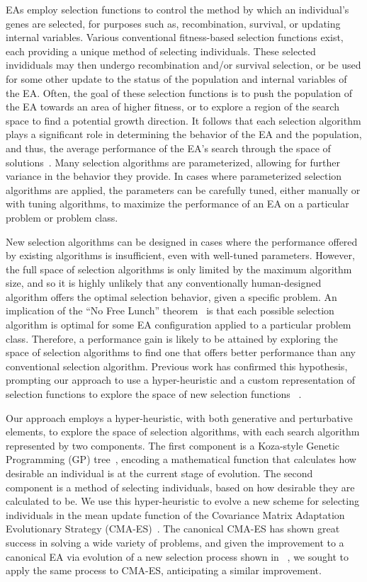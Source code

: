 \documentclass[sigconf]{acmart}
\begin{document}
EAs employ selection functions to control the method by which an individual's genes are selected, for purposes such as, recombination, survival, or updating internal variables. Various conventional fitness-based selection functions exist, each providing a unique method of selecting individuals. These selected invididuals may then undergo recombination and/or survival selection, or be used for some other update to the status of the population and internal variables of the EA. Often, the goal of these selection functions is to push the population of the EA towards an area of higher fitness, or to explore a region of the search space to find a potential growth direction. It follows that each selection algorithm plays a significant role in determining the behavior of the EA and the population, and thus, the average performance of the EA's search through the space of solutions~\citep{woodward2010metaBias}. Many selection algorithms are parameterized, allowing for further variance in the behavior they provide. In cases where parameterized selection algorithms are applied, the parameters can be carefully tuned, either manually or with tuning algorithms, to maximize the performance of an EA on a particular problem or problem class.

New selection algorithms can be designed in cases where the performance offered by existing algorithms is insufficient, even with well-tuned parameters. However, the full space of selection algorithms is only limited by the maximum algorithm size, and so it is highly unlikely that any conventionally human-designed algorithm offers the optimal selection behavior, given a specific problem. An implication of the ``No Free Lunch'' theorem~\citep{wolpert1995noFreeLunch} is that each possible selection algorithm is optimal for some EA configuration applied to a particular problem class. Therefore, a performance gain is likely to be attained by exploring the space of selection algorithms to find one that offers better performance than any conventional selection algorithm. Previous work has confirmed this hypothesis, prompting our approach to use a hyper-heuristic and a custom representation of selection functions to explore the space of new selection functions ~\citep{woodward2011selection}.

Our approach employs a hyper-heuristic, with both generative and perturbative elements, to explore the space of selection algorithms, with each search algorithm represented by two components. The first component is a Koza-style Genetic Programming (GP) tree~\citep{koza1994genetic}, encoding a mathematical function that calculates how desirable an individual is at the current stage of evolution. The second component is a method of selecting individuals, based on how desirable they are calculated to be. We use this hyper-heuristic to evolve a new scheme for selecting individuals in the mean update function of the Covariance Matrix Adaptation Evolutionary Strategy (CMA-ES)~\citep{hansen1996cmaes}. The canonical CMA-ES has shown great success in solving a wide variety of problems, and given the improvement to a canonical EA via evolution of a new selection process shown in ~\citep{richter2018adpsea}, we sought to apply the same process to CMA-ES, anticipating a similar improvement.
\end{document}
